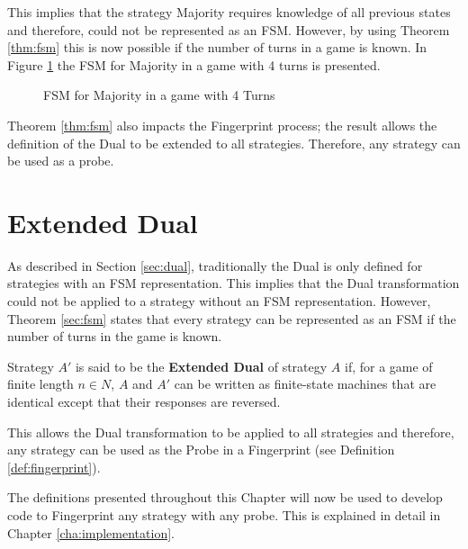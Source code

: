 This implies that the strategy Majority requires knowledge of all previous states and therefore, could not be represented as an FSM.
However, by using Theorem \ref{thm:fsm} this is now possible if the number of turns in a game is known.
In Figure \ref{fig:MajorityFSM} the FSM for Majority in a game with 4 turns is presented.

\begin{figure}[hbtp!]
\centering

\caption{FSM for Majority in a game with 4 Turns}
\label{fig:MajorityFSM}
\end{figure}

Theorem \ref{thm:fsm} also impacts the Fingerprint process; the result allows the definition of the Dual to be extended to all strategies.
Therefore, any strategy can be used as a probe.


\section{Extended Dual}\label{sec:extend-dual}

As described in Section \ref{sec:dual}, traditionally the Dual is only defined for strategies with an FSM representation.
This implies that the Dual transformation could not be applied to a strategy without an FSM representation.
However, Theorem \ref{sec:fsm} states that every strategy can be represented as an FSM if the number of turns in the game is known.

\begin{definition}\label{def:extend-dual}
Strategy $A'$ is said to be the \textbf{Extended Dual} of strategy $A$ if, for a game of finite length $n \in N$, $A$ and $A'$ can be written as finite-state machines that are identical except that their responses are reversed.
\end{definition}

This allows the Dual transformation to be applied to all strategies and therefore, any strategy can be used as the Probe in a Fingerprint (see Definition \ref{def:fingerprint}).

The definitions presented throughout this Chapter will now be used to develop code to Fingerprint any strategy with any probe.
This is explained in detail in Chapter \ref{cha:implementation}.

